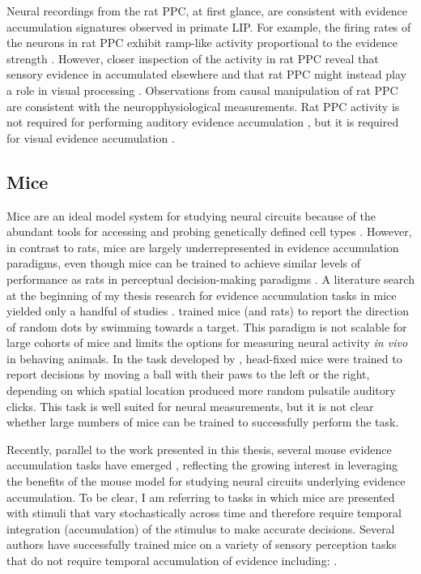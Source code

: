Neural recordings from the rat PPC, at first glance, are consistent with evidence accumulation signatures observed in primate LIP. For example, the firing rates of the neurons in rat PPC exhibit ramp-like activity proportional to the evidence strength \parencite{Raposo2014,Hanks2015}. However, closer inspection of the activity in rat PPC reveal that sensory evidence in accumulated elsewhere \parencite{Hanks2015} and that rat PPC might instead play a role in visual processing \parencite{Licata2017}. Observations from causal manipulation of rat PPC are consistent with the neuropphysiological measurements. Rat PPC activity is not required for performing auditory evidence accumulation \parencite{Raposo2014,Erlich2015}, but it is required for visual evidence accumulation \parencite{Raposo2014,Licata2017}. 

\subsection{Mice}
Mice are an ideal model system for studying neural circuits because of the abundant tools for accessing and probing genetically defined cell types \parencite{Madisen2010,Taniguchi2011,Madisen2012,Madisen2015}. However, in contrast to rats, mice are largely underrepresented in evidence accumulation paradigms, even though mice can be trained to achieve similar levels of performance as rats in perceptual decision-making paradigms \parencite{Douglas2006,Jaramillo2014}. A literature search at the beginning of my thesis research for evidence accumulation tasks in mice yielded only a handful of studies \parencite{Douglas2006,Sanders2012}. \textcite{Douglas2006} trained mice (and rats) to report the direction of random dots by swimming towards a target. This paradigm is not scalable for large cohorts of mice and limits the options for measuring neural activity \emph{in vivo} in behaving animals. In the task developed by \textcite{Sanders2012}, head-fixed mice were trained to report decisions by moving a ball with their paws to the left or the right, depending on which spatial location produced more random pulsatile auditory clicks. This task is well suited for neural measurements, but it is not clear whether large numbers of mice can be trained to successfully perform the task. \par 

Recently, parallel to the work presented in this thesis, several mouse evidence accumulation tasks have emerged \parencite{Stirman2016,Marcos2016,Marbach2016}, reflecting the growing interest in leveraging the benefits of the mouse model for studying neural circuits underlying evidence accumulation. To be clear, I am referring to tasks in which mice are presented with stimuli that vary stochastically across time and therefore require temporal integration (accumulation) of the stimulus to make accurate decisions. Several authors have successfully trained mice on a variety of sensory perception tasks that do not require temporal accumulation of evidence including: 
\parencite{Andermann2010a,Busse2011,Glickfeld2013b,Jaramillo2014,Guo2014b,Burgess2016,Jeong2017}.\par 

